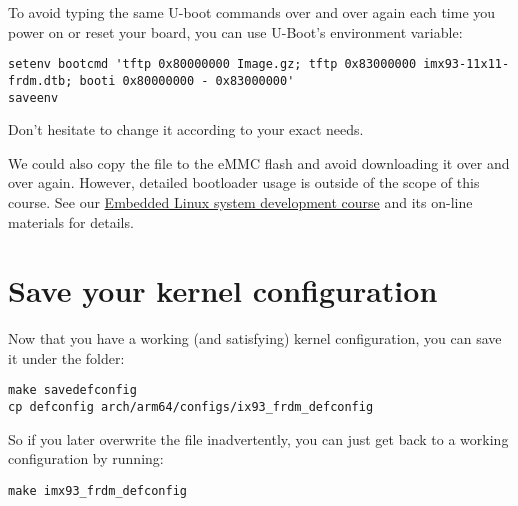 To avoid typing the same U-boot commands over and over again each time
you power on or reset your board, you can use U-Boot's 
environment variable:

{\footnotesize
\begin{verbatim}
setenv bootcmd 'tftp 0x80000000 Image.gz; tftp 0x83000000 imx93-11x11-frdm.dtb; booti 0x80000000 - 0x83000000'
saveenv
\end{verbatim}
}

Don't hesitate to change it according to your exact needs.

We could also copy the  file to the eMMC flash and avoid
downloading it over and over again. However, detailed bootloader
usage is outside of the scope of this course. See our
\href{https://bootlin.com/training/embedded-linux/}{Embedded
Linux system development course} and its on-line materials for
details.

\section{Save your kernel configuration}

Now that you have a working (and satisfying) kernel configuration, you
can save it under the  folder:

\begin{verbatim}
make savedefconfig
cp defconfig arch/arm64/configs/ix93_frdm_defconfig
\end{verbatim}

So if you later overwrite the  file inadvertently, you can
just get back to a working configuration by running:

\begin{verbatim}
make imx93_frdm_defconfig
\end{verbatim}
